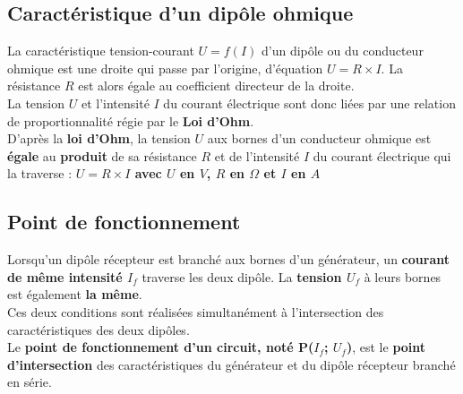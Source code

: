 \documentclass[a4paper,11pt,fleqn]{article}%
\begin{document}
\subsection{Caractéristique d'un dipôle ohmique}
La caractéristique tension-courant $U=f(I)$ d'un dipôle ou du conducteur ohmique est une droite qui passe par l'origine, d'équation $U=R \times I$. La résistance $R$ est alors égale au coefficient directeur de la droite.\\
La tension $U$ et l'intensité $I$ du courant électrique sont donc liées par une relation de proportionnalité régie par le \textbf{Loi d'Ohm}.\\
D'après la \textbf{loi d'Ohm}, la tension $U$ aux bornes d'un conducteur ohmique est \textbf{égale} au \textbf{produit} de sa résistance $R$ et de l'intensité $I$ du courant électrique qui la traverse : 
\textbf{$U=R \times I$ avec $U$ en $V$, $R$ en $\Omega$ et $I$ en $A$}


\subsection{Point de fonctionnement}
Lorsqu'un dipôle récepteur est branché aux bornes d'un générateur, un \textbf{courant de même intensité $I_f$} traverse les deux dipôle. La \textbf{tension $U_f$} à leurs bornes est également \textbf{la même}.\\
Ces deux conditions sont réalisées simultanément à l'intersection des caractéristiques des deux dipôles.\\
Le \textbf{point de fonctionnement d'un circuit, noté P($I_f$; $U_f$)}, est le \textbf{point d'intersection} des caractéristiques du générateur et du dipôle récepteur branché en série.\\
\end{document}
